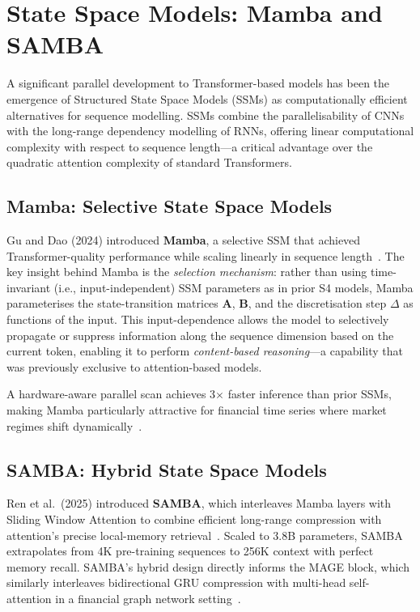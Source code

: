\documentclass[a4paper,11pt]{report}
\begin{document}
\section{State Space Models: Mamba and SAMBA}
\label{sec:ssm}

A significant parallel development to Transformer-based models has been the emergence of Structured State Space Models (SSMs) as computationally efficient alternatives for sequence modelling. SSMs combine the parallelisability of CNNs with the long-range dependency modelling of RNNs, offering linear computational complexity with respect to sequence length---a critical advantage over the quadratic attention complexity of standard Transformers.

\subsection{Mamba: Selective State Space Models}

Gu and Dao (2024) introduced \textbf{Mamba}, a selective SSM that achieved Transformer-quality performance while scaling linearly in sequence length~\cite{gu2024mamba}. The key insight behind Mamba is the \emph{selection mechanism}: rather than using time-invariant (i.e., input-independent) SSM parameters as in prior S4 models, Mamba parameterises the state-transition matrices $\mathbf{A}$, $\mathbf{B}$, and the discretisation step $\Delta$ as functions of the input. This input-dependence allows the model to selectively propagate or suppress information along the sequence dimension based on the current token, enabling it to perform \emph{content-based reasoning}---a capability that was previously exclusive to attention-based models.

A hardware-aware parallel scan achieves 3$\times$ faster inference than prior SSMs, making Mamba particularly attractive for financial time series where market regimes shift dynamically~\cite{gu2024mamba}.

\subsection{SAMBA: Hybrid State Space Models}

Ren et al.\ (2025) introduced \textbf{SAMBA}, which interleaves Mamba layers with Sliding Window Attention to combine efficient long-range compression with attention's precise local-memory retrieval~\cite{ren2025samba}. Scaled to 3.8B parameters, SAMBA extrapolates from 4K pre-training sequences to 256K context with perfect memory recall. SAMBA's hybrid design directly informs the MAGE block, which similarly interleaves bidirectional GRU compression with multi-head self-attention in a financial graph network setting~\cite{tan2025magnet}.
\end{document}
